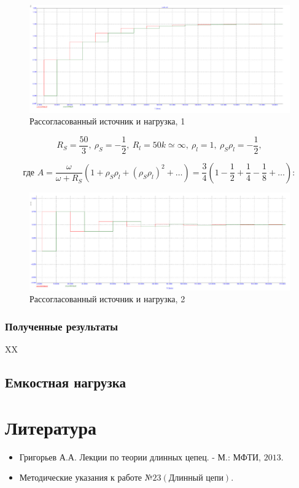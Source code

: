 \documentclass[a4paper, 14pt]{extarticle}%
\begin{document}
\newpage

\begin{figure}[h!]
			\centering
			\includegraphics[width=1.1\linewidth]{./graphs/14.jpg}
			\caption{Рассогласованный источник и нагрузка, 1}
			\label{4.1}
\end{figure}

\[R_{S}=\frac{50}{3},\ \rho_{S}=-\frac{1}{2},\  R_{l}=50k \simeq \infty,\ \rho_{l}=1,\ \rho_{S} \rho_{l}=-\frac{1}{2},\]

\[ \text{где }A=\frac{\omega}{\omega+R_{S}}\left(1+\rho_{S} \rho_{l}+\left(\rho_{S} \rho_{l}\right)^{2}+\ldots\right)=\frac{3}{4}\left(1-\frac{1}{2}+\frac{1}{4}-\frac{1}{8}+\ldots\right) :\]

\begin{figure}[h!]
			\centering
			\includegraphics[width=1.1\linewidth]{./graphs/15.jpg}
			\caption{Рассогласованный источник и нагрузка, 2}
			\label{4.1}
\end{figure}



\subsubsection{Полученные результаты}

XX

\subsection{Емкостная нагрузка}


\section{Литература}

\begin{itemize}

\item Григорьев А.А. Лекции по теории длинных цепец. - М.: МФТИ, $2013 .$

\item Методические указания к работе №$23 (\text{Длинный цепи})$.

\end{itemize}
\end{document}
